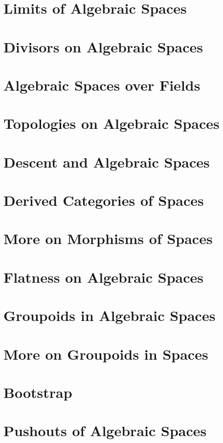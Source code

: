 \chapter{Limits of Algebraic Spaces}
\label{chap:spaces-limits}


\chapter{Divisors on Algebraic Spaces}
\label{chap:spaces-divisors}


\chapter{Algebraic Spaces over Fields}
\label{chap:spaces-over-fields}


\chapter{Topologies on Algebraic Spaces}
\label{chap:spaces-topologies}


\chapter{Descent and Algebraic Spaces}
\label{chap:spaces-descent}


\chapter{Derived Categories of Spaces}
\label{chap:spaces-perfect}


\chapter{More on Morphisms of Spaces}
\label{chap:spaces-more-morphisms}


\chapter{Flatness on Algebraic Spaces}
\label{chap:spaces-flat}


\chapter{Groupoids in Algebraic Spaces}
\label{chap:spaces-groupoids}


\chapter{More on Groupoids in Spaces}
\label{chap:spaces-more-groupoids}


\chapter{Bootstrap}
\label{chap:bootstrap}


\chapter{Pushouts of Algebraic Spaces}
\label{chap:spaces-pushouts}

